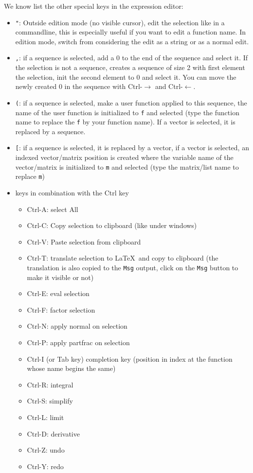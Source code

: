 \documentclass{article}
\begin{document}
We know list the other special keys in the expression editor:
\begin{itemize}
\item \verb|"|: 
Outside edition mode (no visible cursor), 
edit the selection like in a commandline, this is especially
useful if you want to edit a function name.
In edition mode, switch from considering the edit as a string
or as a normal edit. 
\item \verb|,|: if a sequence is selected, add a 0 to the end of the
sequence and select it. If the selection is not a sequence, creates
a sequence of size 2 with first element the selection, init the second
element to 0 and select it. You can move the newly created 0 in the
sequence with Ctrl-$\rightarrow$ and Ctrl-$\leftarrow$.
\item \verb|(|: if a sequence is selected, make a user function
applied to this sequence, the name of the user function is initialized
to \verb|f| and selected (type the function name to replace 
the \verb|f| by your function name). If a vector is selected, it is replaced
by a sequence.
\item \verb|[|: if a sequence is selected, it is replaced by a vector,
if a vector is selected, an indexed vector/matrix position is created
where the variable name of the vector/matrix is initialized to
\verb|m| and selected (type the matrix/list name to replace \verb|m|)
\item keys in combination with the Ctrl key
\begin{itemize}
\item Ctrl-A: select All
\item Ctrl-C: Copy selection to clipboard (like under windows)
\item Ctrl-V: Paste selection from clipboard
\item Ctrl-T: translate selection to \LaTeX\ and copy to clipboard
(the translation is also copied to the \verb|Msg| output, click
on the \verb|Msg| button to make it visible or not)
\item Ctrl-E: eval selection
\item Ctrl-F: factor selection
\item Ctrl-N: apply normal on selection
\item Ctrl-P: apply partfrac on selection
\item Ctrl-I (or Tab key) completion key (position in index at the function
whose name begins the same)
\item Ctrl-R: integral
\item Ctrl-S: simplify
\item Ctrl-L: limit
\item Ctrl-D: derivative
\item Ctrl-Z: undo
\item Ctrl-Y: redo
\end{itemize}
\end{itemize}
\end{document}
